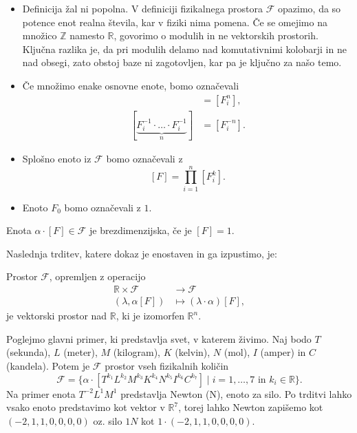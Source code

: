 \documentclass[mat2, tisk]{fmfdelo}
\newcommand{\R}{\mathbb R}
\newcommand{\Z}{\mathbb Z}
\begin{document}
\begin{opomba}
\hfill
\begin{itemize}
 \item Definicija žal ni popolna. V definiciji fizikalnega prostora $\mathcal{F}$
 opazimo, da so potence enot realna števila, kar v fiziki nima pomena. 
 Če se omejimo na množico $\Z$ namesto $\R$, govorimo 
 o modulih in ne vektorskih prostorih. Ključna razlika je, da pri modulih delamo nad 
 komutativnimi kolobarji in ne nad obsegi, zato obstoj baze ni zagotovljen, kar pa 
 je ključno za našo temo.
 \item Če množimo enake osnovne enote, bomo označevali
  \begin{align*}
    [\underbrace{F_i \cdot \ldots \cdot F_i}_n] &= [F^n_i], \\
    [\underbrace{F_i^{-1} \cdot \dots \cdot F_i^{-1}}_n] &= [F^{-n}_{i}].
  \end{align*}
\item Splošno enoto iz $\mathcal{F}$ bomo označevali z
$$
[F] = \prod_{i=1}^n [F_i^{k}].
$$
\item Enoto $F_0$ bomo označevali z $1$.
\end{itemize}
\end{opomba}

\begin{definicija}
Enota $\alpha\cdot[F] \in \mathcal{F}$ je brezdimenzijska, če je $[F] = 1$.
\end{definicija}

Naslednja trditev, katere dokaz je enostaven in ga izpustimo, je: 

\begin{trditev}
Prostor $\mathcal{F}$, opremljen z operacijo 
\begin{align*}
\R \times \mathcal{F} &\rightarrow \mathcal{F} \\
(\lambda, \alpha[F]) &\mapsto (\lambda \cdot \alpha)[F],
\end{align*}
je vektorski prostor nad $\R$, ki je izomorfen $\R^n$.
\end{trditev}

\begin{primer}
 Poglejmo glavni primer, ki predstavlja svet, v katerem živimo. Naj bodo 
 $T$ (sekunda), $L$ (meter), $M$ (kilogram), $K$ (kelvin), $N$ (mol), $I$ (amper) in $C$ (kandela).
 Potem je $\mathcal{F}$ prostor vseh fizikalnih količin
 $$
 \mathcal{F} = \{\alpha \cdot [T^{k_1} L^{k_2} M^{k_3} K^{k_4} N^{k_5} I^{k_6} C^{k_7}] \mid i = 1, \dots, 7 \text{ in } k_i \in \R\}.
 $$
 Na primer enota $T^{-2}L^1M^1$ predstavlja Newton (N), enoto za silo. Po trditvi lahko 
 vsako enoto predstavimo kot vektor v $\R^7$, torej lahko Newton zapišemo kot \\
 $(-2, 1, 1, 0, 0, 0, 0)$ oz. silo $1N$ kot $1 \cdot (-2, 1, 1, 0, 0, 0, 0)$.
 \end{primer}
\end{document}
